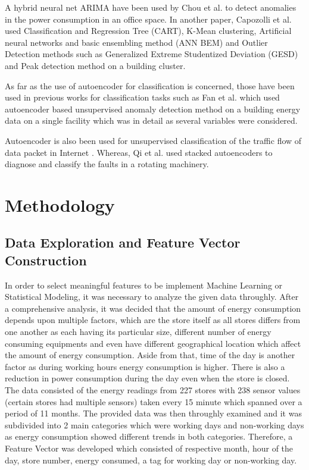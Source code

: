 \documentclass[conference]{IEEEtran}
\begin{document}
A hybrid neural net ARIMA have been used by Chou et al.\cite{bb29} to detect anomalies in the power consumption in an office space. In another paper, Capozolli et al. \cite{bb30} used Classification and Regression Tree (CART), K-Mean clustering, Artificial neural networks and basic ensembling method (ANN BEM) and Outlier Detection methods such as Generalized Extreme Studentized Deviation (GESD) and Peak detection method on a building cluster.




As far as the use of autoencoder for classification is concerned, those have been used in previous works for classification tasks such as Fan et al.\cite{bb26} which used autoencoder based unsupervised anomaly detection method on a building energy data on a single facility which was in detail as several variables were considered.

Autoencoder is also been used for unsupervised classification of the traffic flow of data packet in Internet \cite{bb27}.
Whereas, Qi et al. \cite{bb28} used stacked autoencoders to diagnose and classify the faults in a rotating machinery.







\section{Methodology}

\subsection{\label{sec:level1}	Data Exploration and Feature Vector Construction}

In order to select meaningful features to be implement Machine Learning
or Statistical Modeling, it was necessary to analyze the given data throughly. After a comprehensive analysis, it was decided that the amount of energy
consumption depends upon multiple factors, which are the store itself as
all stores differs from one another as each having its particular size, different
number of energy consuming equipments and even have different geographical
location which affect the amount of energy consumption. Aside from that,
time of the day is another factor as during working hours energy consumption
is higher. There is also a reduction in power consumption
during the day even when the store is closed.
The data consisted of the energy readings from 227 stores with 238 sensor values (certain stores had multiple sensors) taken every 15 minute which spanned over a period of 11 months. The provided data was then throughly examined and it was subdivided into 2 main categories which were working days and non-working days as energy consumption showed different trends in both categories. Therefore, a Feature Vector was developed which consisted of respective month, hour of the day, store number, energy consumed, a tag for working day or non-working day.
\end{document}
